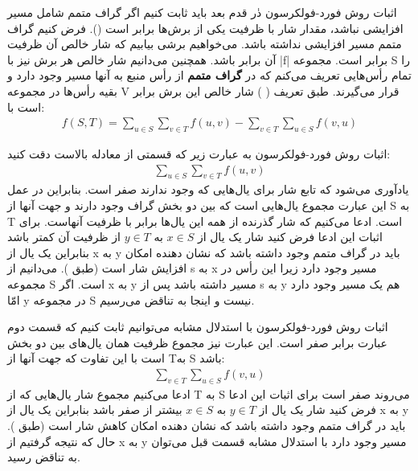 \begin{itemframe}{اثبات روش فورد-فولکرسون}
\itm
دٰر قدم بعد باید ثابت کنیم اگر گراف متمم شامل مسیر افزایشی نباشد، مقدار شار با ظرفیت یکی از برش‌ها برابر است ().
\itm
فرض کنیم گراف متمم مسیر افزایشی نداشته باشد. می‌خواهیم برشی بیابیم که شار خالص آن  ظرفیت آن برابر باشد. همچنین می‌دانیم شار خالص هر برش نیز با |f| برابر است.
\itm
مجموعه S را تمام رأس‌هایی تعریف می‌کنم که در \textbf{گراف متمم} از رأس منبع به آنها مسیر وجود دارد و بقیه رأس‌ها در مجموعه V قرار می‌گیرند. طبق تعریف (  ) شار خالص این برش برابر است با:
\begin{align*}
f(S, T) = \sum_{u \in S} \sum_{v \in T} f(u, v) - \sum_{v \in T} \sum_{u \in S} f(v, u)
\end{align*}
\end{itemframe}

\begin{itemframe}{اثبات روش فورد-فولکرسون}
\itm
به عبارت زیر که قسمتی از معادله بالاست دقت کنید:
\begin{align*}
\sum_{u \in S} \sum_{v \in T} f(u, v)
\end{align*}
یادآوری می‌شود که تابع شار برای یال‌هایی که وجود ندارند صفر است. بنابراین در عمل این عبارت مجموع یال‌هایی است که بین دو بخش گراف وجود دارند و جهت آنها از S به T است. ادعا می‌کنیم که شار گذرنده از همه این یال‌ها برابر با ظرفیت آنهاست.
\itm
برای اثبات این ادعا فرض کنید شار یک یال از
$x \in S$
به
$y \in T$
از ظرفیت آن کمتر باشد بنابراین یک یال از x به y باید در گراف متمم وجود داشته باشد که نشان دهنده امکان افزایش شار است (طبق ). می‌دانیم از s به x مسیر وجود دارد زیرا این رأس در مجموعه S است. اگر x به y مسیر داشته باشد پس از s به y هم یک مسیر وجود دارد امّا y در مجموعه S نیست و اینجا به تناقض می‌رسیم.

\end{itemframe}

\begin{itemframe}{اثبات روش فورد-فولکرسون}
\itm
با استدلال مشابه می‌توانیم ثابت کنیم که قسمت دوم عبارت برابر صفر است. این عبارت نیز مجموع ظرفیت همان یال‌های بین دو بخش است با این تفاوت که جهت آنها از T‌به S باشد:
\begin{align*}
\sum_{v \in T} \sum_{u \in S} f(v, u)
\end{align*}
\itm
ادعا می‌کنیم مجموع شار یال‌هایی که از T به S می‌روند صفر است
\itm
برای اثبات این ادعا فرض کنید شار یک یال از
$y \in T$
به
$x \in S$
بیشتر از صفر باشد بنابراین یک یال از x به y باید در گراف متمم وجود داشته باشد که نشان دهنده امکان کاهش شار است (طبق ). حال که نتیجه گرفتیم از x به y مسیر وجود دارد با استدلال مشابه قسمت قبل می‌توان به تناقض رسید.
\end{itemframe}


